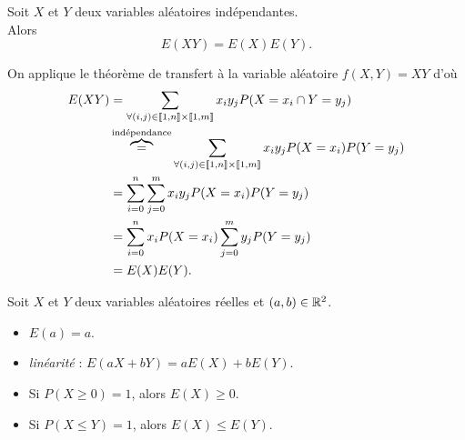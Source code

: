 \documentclass{book}
\begin{document}
\begin{Theoreme}
Soit $X$ et $Y$ deux variables aléatoires indépendantes.\\
Alors \[ E(XY) = E(X) E(Y). \]
\end{Theoreme}
\begin{Demonstration}
On applique le théorème de transfert à la variable aléatoire $f(X,Y)=XY$ d'où
$$\begin{aligned}
 E(XY) &= \sum_{ \forall (i,j)\in  \Intf{1}{n}\times \Intf{1}{m}} x_i y_j P(X=x_i\cap Y=y_j )\\
       &\overbrace{=}^{\text{indépendance} } \sum_{  \forall (i,j)\in  \Intf{1}{n}\times \Intf{1}{m}} x_i y_j P(X=x_i) P(Y=y_j)\\
       &= \sum_{ i=0 }^n  \sum_{j=0}^m  x_i y_j P(X=x_i) P(Y=y_j)\\
       &= \sum_{ i=0 }^n  x_i P(X=x_i) \sum_{j=0}^m y_j  P(Y=y_j) \\
       &= E(X)E(Y).
\end{aligned}$$ 
\end{Demonstration}


\begin{Proposition}
Soit $X$ et $Y$ deux variables aléatoires réelles et $(a,b)\in\mathbb{R}^2$.
\begin{itemize}
\item
  $E(a) = a$.
\item
 \textit{linéarité} :  $E(aX+bY) = aE(X)+bE(Y)$.
\item
  Si $P(X\geq 0)=1$, alors $E(X)\geq 0$.
\item
  Si $P(X\leq Y)=1$, alors $E(X)\leq E(Y)$.
\end{itemize}
\end{Proposition}
\end{document}
